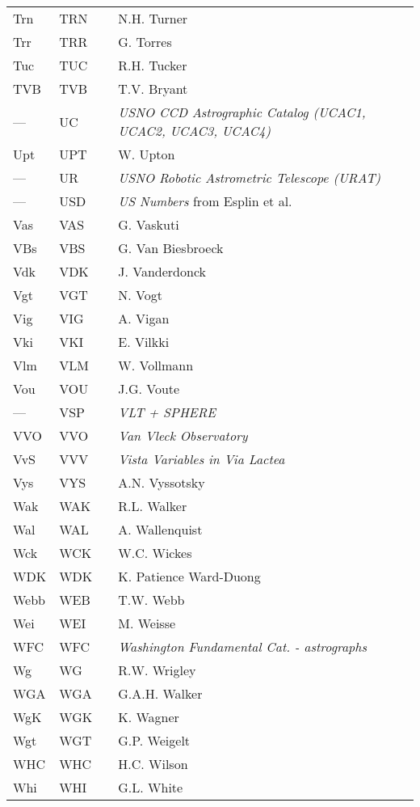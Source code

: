 \begin{longtable}{l|l|c|p{59mm}|l}
Trn & TRN &   & N.H. Turner & \\
Trr & TRR &   & G. Torres & \\
Tuc & TUC &   & R.H. Tucker & \\
TVB & TVB &   & T.V. Bryant & \\\midrule
--- & UC  &   & \emph{USNO CCD Astrographic Catalog (UCAC1, UCAC2, UCAC3, UCAC4) } & \\
Upt & UPT &   & W. Upton & \\
--- & UR  &   & \emph{USNO Robotic Astrometric Telescope (URAT) } & \\
--- & USD &   & \emph{US Numbers} from Esplin et al. & \\\midrule
Vas & VAS &   & G. Vaskuti & \\
VBs & VBS &   & G. Van Biesbroeck & \\
Vdk & VDK &   & J. Vanderdonck & \\
Vgt & VGT &   & N. Vogt & \\
Vig & VIG &   & A. Vigan & \\
Vki & VKI &   & E. Vilkki & \\
Vlm & VLM &   & W. Vollmann & \\
Vou & VOU &   & J.G. Voute & \\
--- & VSP &   & \emph{VLT + SPHERE} & \\
VVO & VVO &   & \emph{Van Vleck Observatory} & \\
VvS & VVV &   & \emph{Vista Variables in Via Lactea} & \\
Vys & VYS &   & A.N. Vyssotsky & \\\midrule
Wak & WAK &   & R.L. Walker & \\
Wal & WAL &   & A. Wallenquist & \\
Wck & WCK &   & W.C. Wickes & \\
WDK & WDK &   & K. Patience Ward-Duong & \\
Webb & WEB &   & T.W. Webb & \\
Wei & WEI &   & M. Weisse & \\
WFC & WFC &   & \emph{Washington Fundamental Cat. - astrographs} & \\
Wg  & WG  &   & R.W. Wrigley & \\
WGA & WGA &   & G.A.H. Walker & \\
WgK & WGK &   & K. Wagner & \\
Wgt & WGT &   & G.P. Weigelt & \\
WHC & WHC &   & H.C. Wilson & \\
Whi & WHI &   & G.L. White & \\

\end{longtable}
